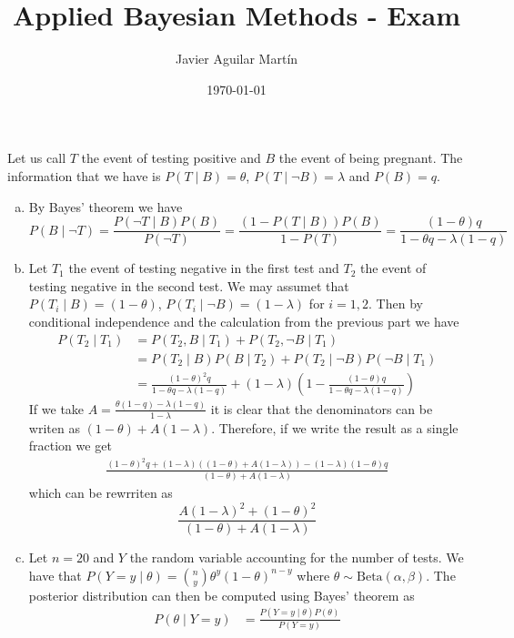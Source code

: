 \documentclass{article}
\theoremstyle{plain}
\theoremstyle{definition}
\newenvironment{exercise}[1]
  {\renewcommand\theexerciseaux{#1}\exerciseaux\label{ejer:#1}}
  {\endexerciseaux}
\newenvironment{sol}{\begin{trivlist}
 \item[\hskip \labelsep {\textit{Solution}.}\hskip \labelsep]}{\end{trivlist}}
\begin{document}
\title{Applied Bayesian Methods - Exam }
\author{Javier Aguilar Martín}
\date{\today}
\maketitle
\begin{exercise}{A1}
\end{exercise}
\begin{sol}
Let us call $T$ the event of testing positive and $B$ the event of being pregnant. The information that we have is $P(T\mid B)=\theta$, $P(T\mid \neg B)=\lambda$ and $P(B)=q$.

\begin{enumerate}[(a)]
\item By Bayes' theorem we have
\[
P(B\mid \neg T) = \frac{P(\neg T\mid B)P(B)}{P(\neg T)} = \frac{(1-P(T\mid B))P(B)}{1-P(T)}=\frac{(1-\theta)q}{1-\theta q-\lambda (1-q)}
\]
\item Let $T_1$ the event of testing negative in the first test and $T_2$ the event of testing negative in the second test. We may assumet that $P(T_i\mid B)=(1-\theta)$, $P(T_i\mid \neg B)=(1-\lambda)$ for $i=1,2$. Then by conditional independence and the calculation from the previous part we have
\begin{align*}
P(T_2\mid T_1) &= P(T_2,B\mid T_1)+P(T_2,\neg B\mid T_1)\\
 &= P(T_2\mid B)P(B\mid T_2)+P(T_2\mid \neg B)P(\neg B\mid T_1)\\
 &= \frac{(1-\theta)^2 q}{1-\theta q - \lambda(1-q)}+(1-\lambda)\left(1-\frac{(1-\theta) q}{1-\theta q - \lambda(1-q)}\right)
\end{align*}
If we take $A=\frac{\theta(1-q)-\lambda(1-q)}{1-\lambda}$ it is clear that the denominators can be writen as $(1-\theta)+A(1-\lambda)$. Therefore, if we write the result as a single fraction we get
\begin{align*}
\frac{(1-\theta)^2 q + (1-\lambda)((1-\theta)+A(1-\lambda))-(1-\lambda)(1-\theta)q}{(1-\theta)+A(1-\lambda)}
\end{align*}
which can be rewrriten as
\[
\frac{A(1-\lambda)^2+(1-\theta)^2}{(1-\theta)+A(1-\lambda)}
\]
\item Let $n=20$ and $Y$ the random variable accounting for the number of tests. We have that $P(Y=y\mid\theta)=\binom{n}{y}\theta^y(1-\theta)^{n-y}$ where $\theta\sim\mathrm{Beta}(\alpha,\beta)$. The posterior distribution can then be computed using Bayes' theorem as
\begin{align*}
P(\theta\mid Y=y)&=\frac{P(Y=y\mid\theta)P(\theta)}{P(Y=y)}\\

\end{align*}
\end{enumerate}
\end{sol}
\end{document}
